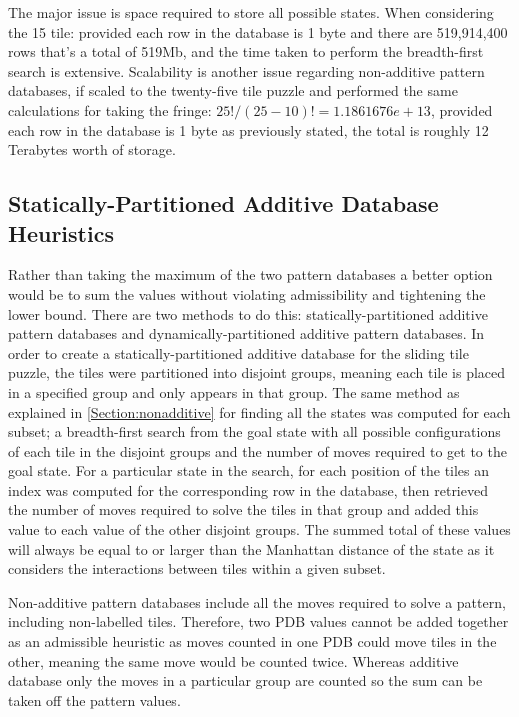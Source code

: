 \documentclass[final]{cmpreport}
\begin{document}
The major issue is space required to store all possible states. When considering the 15 tile: provided each row in the database is 1 byte and there are 519,914,400 rows that's a total of 519Mb, and the time taken to perform the breadth-first search is extensive. Scalability is another issue regarding non-additive pattern databases, if scaled to the twenty-five tile puzzle and performed the same calculations for taking the fringe: $25!/(25-10)!=1.1861676e+13$, provided each row in the database is 1 byte as previously stated, the total is roughly 12 Terabytes worth of storage.







\subsection{Statically-Partitioned Additive Database Heuristics}
Rather than taking the maximum of the two pattern databases a better option would be to sum the values without violating admissibility and tightening the lower bound. There are two methods to do this: statically-partitioned additive pattern databases and dynamically-partitioned additive pattern databases. In order to create a statically-partitioned additive database for the sliding tile puzzle, the tiles were partitioned into disjoint groups, meaning each tile is placed in a specified group and only appears in that group. The same method as explained in \ref{Section:nonadditive} for finding all the states was computed for each subset; a breadth-first search from the goal state with all possible configurations of each tile in the disjoint groups and the number of moves required to get to the goal state. For a particular state in the search, for each position of the tiles an index was computed for the corresponding row in the database, then retrieved the number of moves required to solve the tiles in that group and added this value to each value of the other disjoint groups. The summed total of these values will always be equal to or larger than the Manhattan distance of the state as it considers the interactions between tiles within a given subset.	

Non-additive pattern databases include all the moves required to solve a pattern, including non-labelled tiles. Therefore, two PDB values cannot be added together as an admissible heuristic as moves counted in one PDB could move tiles in the other, meaning the same move would be counted twice. Whereas additive database only the moves in a particular group are counted so the sum can be taken off the pattern values.
\end{document}

